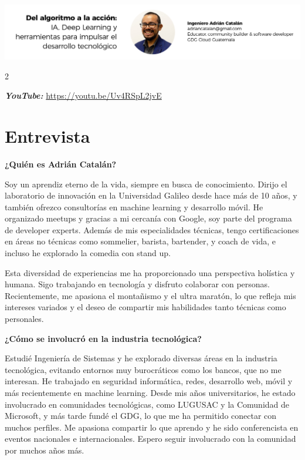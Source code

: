 \documentclass[12pt,spanish,Letterpaper,openany]{book}
\begin{document}
\begin{center}\includegraphics[width=1\linewidth]{autores/pareja00_adrian} \end{center}

\begin {multicols}{2}

\textbf{\emph{YouTube:}} \url{https://youtu.be/Uv4RSpL2jvE}

\hypertarget{entrevista}{%
\section{Entrevista}\label{entrevista}}

\textbf{¿Quién es Adrián Catalán?}

Soy un aprendiz eterno de la vida, siempre en busca de conocimiento. Dirijo el laboratorio de innovación en la Universidad Galileo desde hace más de 10 años, y también ofrezco consultorías en machine learning y desarrollo móvil. He organizado meetups y gracias a mi cercanía con Google, soy parte del programa de developer experts. Además de mis especialidades técnicas, tengo certificaciones en áreas no técnicas como sommelier, barista, bartender, y coach de vida, e incluso he explorado la comedia con stand up.

Esta diversidad de experiencias me ha proporcionado una perspectiva holística y humana. Sigo trabajando en tecnología y disfruto colaborar con personas. Recientemente, me apasiona el montañismo y el ultra maratón, lo que refleja mis intereses variados y el deseo de compartir mis habilidades tanto técnicas como personales.

\textbf{¿Cómo se involucró en la industria tecnológica?}

Estudié Ingeniería de Sistemas y he explorado diversas áreas en la industria tecnológica, evitando entornos muy burocráticos como los bancos, que no me interesan. He trabajado en seguridad informática, redes, desarrollo web, móvil y más recientemente en machine learning. Desde mis años universitarios, he estado involucrado en comunidades tecnológicas, como LUGUSAC y la Comunidad de Microsoft, y más tarde fundé el GDG, lo que me ha permitido conectar con muchos perfiles. Me apasiona compartir lo que aprendo y he sido conferencista en eventos nacionales e internacionales. Espero seguir involucrado con la comunidad por muchos años más.


\end{multicols}
\end{document}
